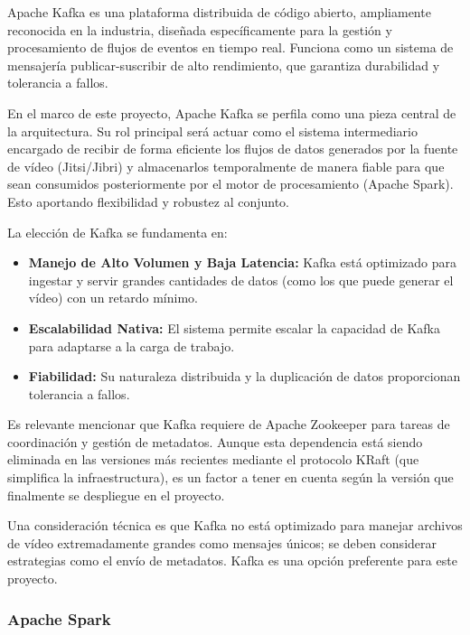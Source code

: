 Apache Kafka \cite{KafkaWebDoc} es una plataforma distribuida de código abierto, ampliamente reconocida en la industria, diseñada específicamente para la gestión y procesamiento de flujos de eventos en tiempo real. Funciona como un sistema de mensajería publicar-suscribir de alto rendimiento, que garantiza durabilidad y tolerancia a fallos.

En el marco de este proyecto, Apache Kafka se perfila como una pieza central de la arquitectura. Su rol principal será actuar como el sistema intermediario encargado de recibir de forma eficiente los flujos de datos generados por la fuente de vídeo (Jitsi/Jibri) y almacenarlos temporalmente de manera fiable para que sean consumidos posteriormente por el motor de procesamiento (Apache Spark). Esto aportando flexibilidad y robustez al conjunto.

La elección de Kafka se fundamenta en:
\begin{itemize}
    \item \textbf{Manejo de Alto Volumen y Baja Latencia:} Kafka está optimizado para ingestar y servir grandes cantidades de datos (como los que puede generar el vídeo) con un retardo mínimo.
    \item \textbf{Escalabilidad Nativa:} El sistema permite escalar la capacidad de Kafka para adaptarse a la carga de trabajo.
    \item \textbf{Fiabilidad:} Su naturaleza distribuida y la duplicación de datos proporcionan tolerancia a fallos.
\end{itemize}

Es relevante mencionar que Kafka requiere de Apache Zookeeper para tareas de coordinación y gestión de metadatos. Aunque esta dependencia está siendo eliminada en las versiones más recientes mediante el protocolo KRaft (que simplifica la infraestructura), es un factor a tener en cuenta según la versión que finalmente se despliegue en el proyecto.

Una consideración técnica es que Kafka no está optimizado para manejar archivos de vídeo extremadamente grandes como mensajes únicos; se deben considerar estrategias como el envío de metadatos. Kafka es una opción preferente para este proyecto.

\subsubsection{Apache Spark}

